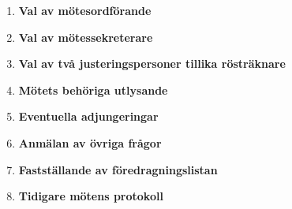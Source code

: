 \documentclass{dagordning}
\begin{document}




  \begin{enumerate}
    \item\textbf{Val av mötesordförande}
    \item\textbf{Val av mötessekreterare}
    \item\textbf{Val av två justeringspersoner tillika rösträknare}
    \item\textbf{Mötets behöriga utlysande}
    \item\textbf{Eventuella adjungeringar}
    \item\textbf{Anmälan av övriga frågor}
    \item\textbf{Fastställande av föredragningslistan}
    \item\textbf{Tidigare mötens protokoll}
  \end{enumerate}
\end{document}

